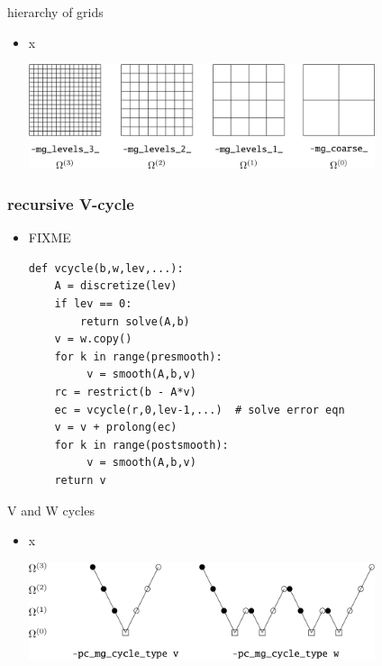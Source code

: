\documentclass[10pt,
               svgnames,
               hyperref={colorlinks,citecolor=DeepPink4,linkcolor=FireBrick,urlcolor=Maroon},
               usepdftitle=false]{beamer}
\begin{document}
\begin{frame}{hierarchy of grids}
\begin{itemize}
\item x

\hfill \includegraphics[width=0.8\textwidth]{images/multigrid-grids.png}
\end{itemize}
\end{frame}


\begin{frame}[fragile]
\frametitle{recursive V-cycle}
\begin{itemize}
\item FIXME
\begin{verbatim}
def vcycle(b,w,lev,...):
    A = discretize(lev)
    if lev == 0:
        return solve(A,b)
    v = w.copy()
    for k in range(presmooth):
         v = smooth(A,b,v)
    rc = restrict(b - A*v)
    ec = vcycle(r,0,lev-1,...)  # solve error eqn
    v = v + prolong(ec)
    for k in range(postsmooth):
         v = smooth(A,b,v)
    return v
\end{verbatim}
\end{itemize}
\end{frame}


\begin{frame}{V and W cycles}
\begin{itemize}
\item x

\hfill \includegraphics[width=0.8\textwidth]{images/multigrid-cycles.png}
\end{itemize}
\end{frame}
\end{document}
